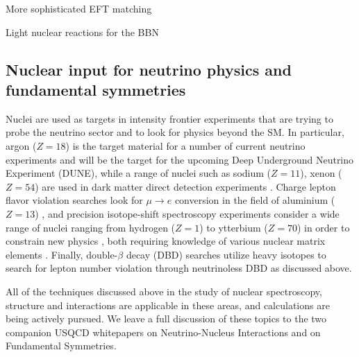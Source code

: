 More sophisticated EFT matching 

Light nuclear reactions for the BBN


\subsection{Nuclear input for neutrino physics and fundamental symmetries}


Nuclei are used as targets in intensity frontier experiments that are trying to probe the neutrino sector and to look for physics beyond the SM. In particular, argon ($Z=18$) is the target material for a number of current neutrino experiments and will be the target for the upcoming Deep Underground Neutrino Experiment (DUNE), while a range of nuclei such as sodium ($Z=11$), xenon ($Z=54$) are used in dark matter direct detection experiments \cite{Undagoitia:2015gya}. Charge lepton flavor violation searches look for $\mu\to e$ conversion in the field of aluminium ($Z=13$) \cite{Albrecht:2013wet}, and precision isotope-shift spectroscopy experiments consider a wide range of nuclei ranging from hydrogen ($Z=1$) to ytterbium ($Z=70$) in  order to constrain new physics \cite{Delaunay:2016brc,Delaunay:2017dku}, both requiring knowledge of various nuclear matrix elements \cite{Chang:2017eiq}. Finally, double-$\beta$ decay (DBD) searches utilize heavy isotopes to search for lepton number violation through neutrinoless DBD \cite{DellOro:2016tmg,Engel:2016xgb} as discussed above.

All of the techniques discussed above in the study of nuclear spectroscopy, structure and interactions are applicable in these areas, and calculations are being actively pursued. We leave a full discussion of these topics to the two companion USQCD whitepapers on Neutrino-Nucleus Interactions and on Fundamental Symmetries.



